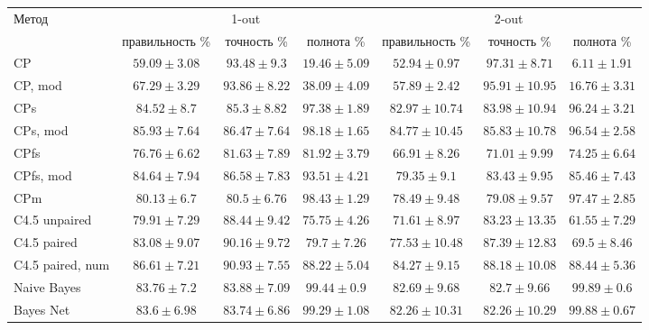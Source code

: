 		
	\begin{sidewaystable}[ph!]
		\centering
		\begin{tabular}{|l|ccc|ccc|}
			\hline
			\multirow{2}{*}{Метод}   & \multicolumn{3}{c|}{1-out}                             & \multicolumn{3}{c|}{2-out}         \\ \cline{2-7}  
									 & правильность \%  & точность \%      & полнота \%       & правильность \%   & точность \%       & полнота \% \rule{0pt}{2.4ex} \\ \hline
			CP 						 & $59.09 \pm 3.08$ & $93.48 \pm 9.3$  & $19.46 \pm 5.09$ & $52.94 \pm 0.97$  & $97.31 \pm 8.71$  & $6.11 \pm 1.91$ \rule{0pt}{2.4ex} \\ 
			CP, mod					 & $67.29 \pm 3.29$ & $93.86 \pm 8.22$ & $38.09 \pm 4.09$ & $57.89 \pm 2.42$ & $95.91 \pm 10.95$ & $16.76 \pm 3.31$ \\ 
			CPs 					 & $84.52 \pm 8.7$  & $85.3 \pm 8.82$  & $97.38 \pm 1.89$ & $82.97 \pm 10.74$ & $83.98 \pm 10.94$ & $96.24 \pm 3.21$ \\
			CPs, mod				 & $85.93 \pm 7.64$ & $86.47 \pm 7.64$ & $98.18 \pm 1.65$ & $84.77 \pm 10.45$ & $85.83 \pm 10.78$ & $96.54 \pm 2.58$ \\
			CPfs					 & $76.76 \pm 6.62$ & $81.63 \pm 7.89$ & $81.92 \pm 3.79$ & $66.91 \pm 8.26$  & $71.01 \pm 9.99$  & $74.25 \pm 6.64$ \\
			CPfs, mod				 & $84.64 \pm 7.94$ & $86.58 \pm 7.83$ & $93.51 \pm 4.21$ & $79.35 \pm 9.1$  & $83.43 \pm 9.95$  & $85.46 \pm 7.43$ \\ 
			CPm						 & $80.13 \pm 6.7$  & $80.5 \pm 6.76 $ & $98.43 \pm 1.29$ & $78.49 \pm 9.48$  & $79.08 \pm 9.57$  & $97.47 \pm 2.85$ \\ 
			C4.5 unpaired			 & $79.91 \pm 7.29$ & $88.44 \pm 9.42$ & $75.75 \pm 4.26$ & $71.61 \pm 8.97$  & $83.23 \pm 13.35$ & $61.55 \pm 7.29$ \\ 
			C4.5 paired  			 & $83.08 \pm 9.07$ & $90.16 \pm 9.72$ & $79.7 \pm 7.26$  & $77.53 \pm 10.48$ & $87.39 \pm 12.83$ & $69.5 \pm 8.46$ \\ 
			C4.5 paired, num 	     & $86.61 \pm 7.21$ & $90.93 \pm 7.55$ & $88.22 \pm 5.04$ & $84.27 \pm 9.15$  & $88.18 \pm 10.08$ & $88.44 \pm 5.36$ \\
			Naive Bayes  			 & $83.76 \pm 7.2$  & $83.88 \pm 7.09$ & $99.44 \pm 0.9$  & $82.69 \pm 9.68$  & $82.7 \pm 9.66$   & $99.89 \pm 0.6$ \\ 
			Bayes Net  				 & $83.6 \pm 6.98$  & $83.74 \pm 6.86$ & $99.29 \pm 1.08$ & $82.26 \pm 10.31$ & $82.26 \pm 10.29$ & $99.88 \pm 0.67$ \\ 
			\hline
		\end{tabular}
		\label{tbl:cars_results}
		

\end{sidewaystable}
